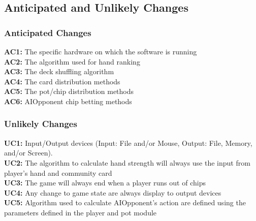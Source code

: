 \documentclass[11pt]{article}
\begin{document}
    \subsection{Anticipated and Unlikely Changes}
    \subsubsection{Anticipated Changes}
    \textbf{AC1:} The specific hardware on which the software is running\\
    \textbf{AC2:} The algorithm used for hand ranking\\
    \textbf{AC3:} The deck shuffling algorithm\\
    \textbf{AC4:} The card distribution methods\\
    \textbf{AC5:} The pot/chip distribution methods\\
    \textbf{AC6:} AIOpponent chip betting methods\\
    
     
    \subsubsection{Unlikely Changes}
    \textbf{UC1:} Input/Output devices (Input: File and/or Mouse, Output: File, Memory, and/or Screen).\\
    \textbf{UC2:} The algorithm to calculate hand strength will always use the input from player’s hand and community card\\
    \textbf{UC3:} The game will always end when a player runs out of chips\\
    \textbf{UC4:} Any change to game state are always display to output devices\\
    \textbf{UC5:} Algorithm used to calculate AIOpponent’s action are defined using the parameters defined in the player and pot module\\
    
\end{document}

